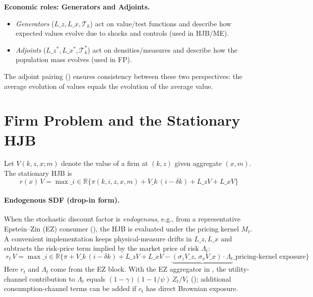 ﻿\documentclass[11pt,letterpaper,oneside]{article}
\numberwithin{equation}{section}
\newcommand{\ac}[1]{{\mdseries\textsc{#1}}}
\newcommand{\R}{\mathbb{R}}
\newcommand{\1}{\mathbf{1}}
\newcommand{\Lz}{L\_z}
\newcommand{\Lx}{L\_x}
\newcommand{\Lzadj}{L\_z^{\!*}}
\begin{document}
\begin{tcolorbox}[didacticstyle]
\textbf{Economic roles: Generators and Adjoints.}
\begin{itemize}[leftmargin=1.15em,itemsep=0.25em]
 \item \emph{Generators} ($\Lz, \Lx, \mathcal T_k$) act on value/test functions and describe how expected values evolve due to shocks and controls (used in HJB/ME).
 \item \emph{Adjoints} ($\Lzadj, \Lx^{\!*}, \mathcal T_k^{\!*}$) act on densities/measures and describe how the population mass evolves (used in FP).
\end{itemize}
The adjoint pairing () ensures consistency between these two perspectives: the average evolution of values equals the evolution of the average value.
\end{tcolorbox}

\section{Firm Problem and the Stationary HJB}

Let $V(k,z,x;m)$ denote the value of a firm at $(k,z)$ given aggregate $(x,m)$. The stationary \ac{HJB} is
\begin{equation}
\boxed{\; r(x)\,V 
  = \max\_{i\in\R} \Big\{ \pi(k,i,z,x,m) + V\_k\,(i-\delta k) + \Lz V + \Lx V \Big\} \;}
\tag{HJB}\label{eq:HJB}
\end{equation}

\paragraph{Endogenous SDF (drop-in form).}
When the stochastic discount factor is \emph{endogenous}, e.g., from a representative Epstein--Zin (EZ) consumer (), the HJB is evaluated under the pricing kernel $M_t$. A convenient implementation keeps physical-measure drifts in $\Lz,\Lx$ and subtracts the risk-price term implied by the market price of risk $\Lambda_t$:
\begin{equation}\label{eq:HJB-EZ}
\boxed{\; r_t\,V 
  = \max\_{i\in\R} \Big\{ \pi + V\_k\,(i-\delta k) + \Lz V + \Lx V 
      - \underbrace{(\sigma_z V\_z,\, \sigma_x V\_x)\cdot\Lambda_t}\_{\text{pricing-kernel exposure}} \Big\} \;}
\end{equation}
Here $r_t$ and $\Lambda_t$ come from the EZ block. With the EZ aggregator in , the utility-channel contribution to $\Lambda_t$ equals $(1-\gamma)(1-1/\psi)\,Z_t/V_t$ (); additional consumption-channel terms can be added if $c_t$ has direct Brownian exposure.
\end{document}
